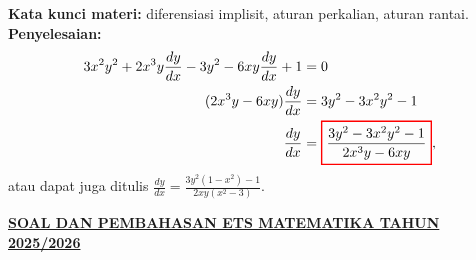 \documentclass[10pt,openany,a4paper]{article}
\theoremstyle{definition}
\theoremstyle{definition}
\theoremstyle{plain}
\newenvironment{jawab}[2][tes]{%
\par\noindent\textbf{Kata kunci materi:} #1.\\
\textbf{Penyelesaian:} #2%
}{}
\begin{document}
\begin{enumerate}
\begin{jawab}[diferensiasi implisit, aturan perkalian, aturan rantai]
{\begin{align*}
                    3x^2y^2 + 2x^3y\frac{dy}{dx} - 3y^2 - 6xy\frac{dy}{dx} + 1 &= 0\\
                    (2x^3y - 6xy)\frac{dy}{dx} &= 3y^2 - 3x^2y^2 - 1\\
                    \frac{dy}{dx} &= \colorlet{oldcolor}{.}
        \color{red}
        \setlength{\fboxrule}{1pt} \boxed{\color{oldcolor}\frac{3y^2 - 3x^2y^2 - 1}{2x^3y - 6xy}}\color{oldcolor},
                \end{align*}
                atau dapat juga ditulis $\displaystyle\frac{dy}{dx} = \frac{3y^2(1-x^2) - 1}{2xy(x^2-3)}$.
            }
            \end{jawab}
        \end{enumerate}
 \newpage
 \begin{center}
	{\underline{\textbf{\MakeUppercase{Soal dan Pembahasan ETS Matematika Tahun 2025/2026}}}}
    \end{center}
\end{document}
